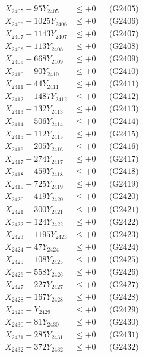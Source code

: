 \documentclass[a4paper,10pt]{article}
\begin{document}
{\begin{align}
X_{2405} - 95Y_{2405} &\leq +0 && \text{(G2405)} \\
X_{2406} - 1025Y_{2406} &\leq +0 && \text{(G2406)} \\
X_{2407} - 1143Y_{2407} &\leq +0 && \text{(G2407)} \\
X_{2408} - 113Y_{2408} &\leq +0 && \text{(G2408)} \\
X_{2409} - 668Y_{2409} &\leq +0 && \text{(G2409)} \\
X_{2410} - 90Y_{2410} &\leq +0 && \text{(G2410)} \\
\allowbreak
X_{2411} - 44Y_{2411} &\leq +0 && \text{(G2411)} \\
X_{2412} - 1487Y_{2412} &\leq +0 && \text{(G2412)} \\
X_{2413} - 132Y_{2413} &\leq +0 && \text{(G2413)} \\
X_{2414} - 506Y_{2414} &\leq +0 && \text{(G2414)} \\
X_{2415} - 112Y_{2415} &\leq +0 && \text{(G2415)} \\
X_{2416} - 205Y_{2416} &\leq +0 && \text{(G2416)} \\
X_{2417} - 274Y_{2417} &\leq +0 && \text{(G2417)} \\
X_{2418} - 459Y_{2418} &\leq +0 && \text{(G2418)} \\
X_{2419} - 725Y_{2419} &\leq +0 && \text{(G2419)} \\
X_{2420} - 419Y_{2420} &\leq +0 && \text{(G2420)} \\
\allowbreak
X_{2421} - 300Y_{2421} &\leq +0 && \text{(G2421)} \\
X_{2422} - 124Y_{2422} &\leq +0 && \text{(G2422)} \\
X_{2423} - 1195Y_{2423} &\leq +0 && \text{(G2423)} \\
X_{2424} - 47Y_{2424} &\leq +0 && \text{(G2424)} \\
X_{2425} - 108Y_{2425} &\leq +0 && \text{(G2425)} \\
X_{2426} - 558Y_{2426} &\leq +0 && \text{(G2426)} \\
X_{2427} - 227Y_{2427} &\leq +0 && \text{(G2427)} \\
X_{2428} - 167Y_{2428} &\leq +0 && \text{(G2428)} \\
X_{2429} - Y_{2429} &\leq +0 && \text{(G2429)} \\
X_{2430} - 81Y_{2430} &\leq +0 && \text{(G2430)} \\
\allowbreak
X_{2431} - 285Y_{2431} &\leq +0 && \text{(G2431)} \\
X_{2432} - 372Y_{2432} &\leq +0 && \text{(G2432)} \\

\end{align}}
\end{document}

